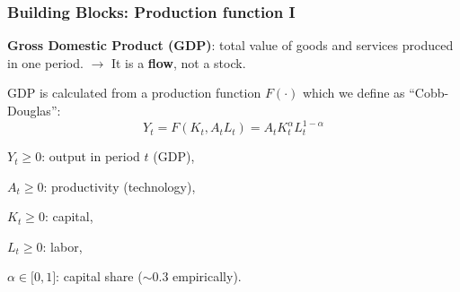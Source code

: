 \documentclass[xcolor=x11names,compress,aspectratio=169]{beamer}%
\makeatletter
\renewenvironment{itemize}{\begin{compactitemize}[<+-| alert@+>]}{\end{compactitemize}}
\makeatother
\begin{document}
\begin{frame}%
%

\frametitle{Building Blocks: Production function I}%


\begin{itemize}
\item \textbf{Gross Domestic Product (GDP)}: total value of goods and services
produced in one period. $\rightarrow$ It is a \textbf{flow}, not a stock.
\vspace{0.3cm}

\item GDP is calculated from a production function $F(\cdot)$ which we define
as \textquotedblleft Cobb-Douglas\textquotedblright:
\[
Y_{t}=F(K_{t},A_{t}L_{t})=A_{t}K_{t}^{\alpha}L_{t}^{1-\alpha}%
\]


\begin{itemize}
\item $Y_{t}\geq0$: output in period $t$ (GDP),

\item $A_{t}\geq0$: productivity (technology),

\item $K_{t}\geq0$: capital,

\item $L_{t}\geq0$: labor,

\item $\alpha\in\lbrack0,1]$: capital share ($\sim0.3$ empirically).
\end{itemize}
\end{itemize}

%

\transboxout
\end{frame}%
%
\end{document}

